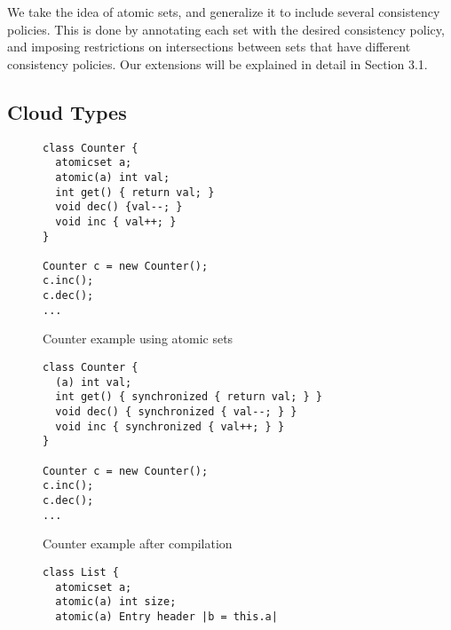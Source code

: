 We take the idea of atomic sets, and generalize it to include several
consistency policies. This is done by annotating each set with the desired
consistency policy, and imposing restrictions on intersections between sets that
have different consistency policies. Our extensions will be explained in detail in Section 3.1.

\subsection{Cloud Types}




\begin{figure}[tp]
\begin{lstlisting}
class Counter {
  atomicset a;
  atomic(a) int val;
  int get() { return val; }
  void dec() {val--; }
  void inc { val++; }
}

Counter c = new Counter();
c.inc();
c.dec();
...
\end{lstlisting}
\caption{Counter example using atomic sets}
\label{lst:acCounter}
\end{figure}



\begin{figure}[tp]
\begin{lstlisting}
class Counter {
  (a) int val;
  int get() { synchronized { return val; } }
  void dec() { synchronized { val--; } }
  void inc { synchronized { val++; } }
}

Counter c = new Counter();
c.inc();
c.dec();
...
\end{lstlisting}
\caption{Counter example after compilation}
\label{lst:acCounterCompiled}
\end{figure}


\begin{figure}[tp]
\begin{lstlisting}
class List {
  atomicset a;
  atomic(a) int size;
  atomic(a) Entry header |b = this.a|
  ....
}
\end{lstlisting}
\caption{Linked List example with addAll method}
\label{lst:acList}
\end{figure}




































